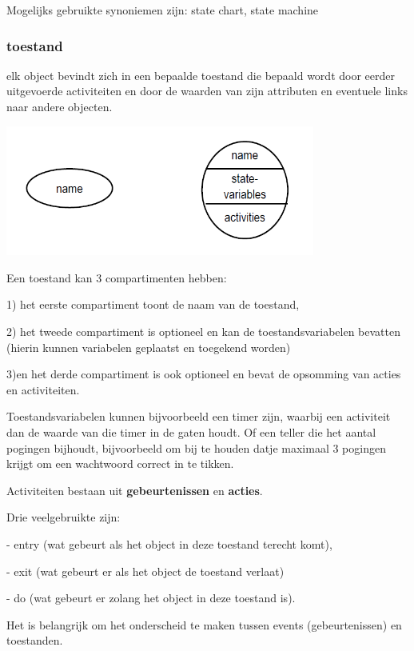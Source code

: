 Mogelijks gebruikte synoniemen zijn: state chart, state machine


\subsubsection{toestand}

elk object bevindt zich in een bepaalde toestand die bepaald wordt door eerder uitgevoerde activiteiten en door de waarden van zijn attributen en eventuele links naar andere objecten.


\begin{center}
\includegraphics[width=4in]{img/state2}%
\end{center}
\newpage

Een toestand kan 3 compartimenten hebben:

1) het eerste compartiment toont de naam van de toestand, 

2) het tweede compartiment is optioneel en kan de toestandsvariabelen bevatten (hierin kunnen variabelen geplaatst en toegekend worden) 

3)en het derde compartiment is ook optioneel en bevat de opsomming van acties en activiteiten.

Toestandsvariabelen kunnen bijvoorbeeld een timer zijn, waarbij een activiteit dan de waarde van die timer in de gaten houdt. Of een teller die het aantal pogingen bijhoudt, bijvoorbeeld om bij te houden datje maximaal 3 pogingen krijgt om een wachtwoord correct in te tikken.

Activiteiten bestaan uit \textbf{gebeurtenissen} en \textbf{acties}. 

Drie veelgebruikte zijn: 

- entry (wat gebeurt als het object in deze toestand terecht komt), 

- exit (wat gebeurt er als het object de toestand verlaat) 

- do (wat gebeurt er zolang het object in deze toestand is).

Het is belangrijk om het onderscheid te maken tussen events (gebeurtenissen) en toestanden. 

